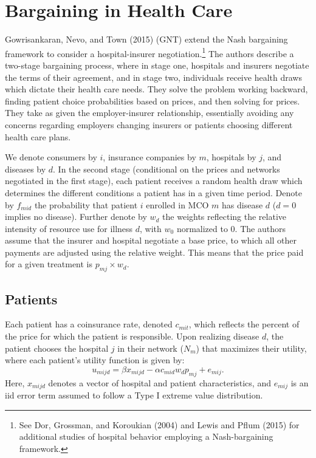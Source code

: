 \documentclass[
  letterpaper,
  DIV=11,
  numbers=noendperiod]{scrreport}
\theoremstyle{definition}
\theoremstyle{remark}
\begin{document}
\hypertarget{bargaining-in-health-care}{%
\section{Bargaining in Health Care}\label{bargaining-in-health-care}}

Gowrisankaran, Nevo, and Town (2015) (GNT) extend the Nash bargaining
framework to consider a hospital-insurer negotiation.\footnote{See Dor,
  Grossman, and Koroukian (2004) and Lewis and Pflum (2015) for
  additional studies of hospital behavior employing a Nash-bargaining
  framework.} The authors describe a two-stage bargaining process, where
in stage one, hospitals and insurers negotiate the terms of their
agreement, and in stage two, individuals receive health draws which
dictate their health care needs. They solve the problem working
backward, finding patient choice probabilities based on prices, and then
solving for prices. They take as given the employer-insurer
relationship, essentially avoiding any concerns regarding employers
changing insurers or patients choosing different health care plans.

We denote consumers by \(i\), insurance companies by \(m\), hospitals by
\(j\), and diseases by \(d\). In the second stage (conditional on the
prices and networks negotiated in the first stage), each patient
receives a random health draw which determines the different conditions
a patient has in a given time period. Denote by \(f_{mid}\) the
probability that patient \(i\) enrolled in MCO \(m\) has disease \(d\)
(\(d=0\) implies no disease). Further denote by \(w_{d}\) the weights
reflecting the relative intensity of resource use for illness \(d\),
with \(w_{0}\) normalized to 0. The authors assume that the insurer and
hospital negotiate a base price, to which all other payments are
adjusted using the relative weight. This means that the price paid for a
given treatment is \(p_{mj} \times w_{d}\).

\hypertarget{patients}{%
\subsection{Patients}\label{patients}}

Each patient has a coinsurance rate, denoted \(c_{mit}\), which reflects
the percent of the price for which the patient is responsible. Upon
realizing disease \(d\), the patient chooses the hospital \(j\) in their
network (\(N_{m}\)) that maximizes their utility, where each patient's
utility function is given by:
\[u_{mijd} = \beta x_{mijd} - \alpha c_{mid} w_{d} p_{mj} + e_{mij}.\]
Here, \(x_{mijd}\) denotes a vector of hospital and patient
characteristics, and \(e_{mij}\) is an iid error term assumed to follow
a Type I extreme value distribution.
\end{document}
